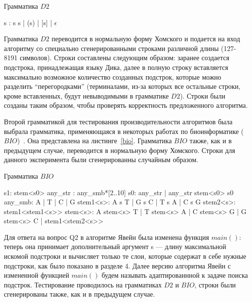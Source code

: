 \begin{listing}
\caption{Грамматика $D2$}

\quad\quad\quad\quad\quad\quad\quad\quad\quad\quad\quad\quad s : s s  |  (s) |  [s]  |  $\epsilon$

\label{dyck}
\end{listing}

Грамматика $D2$ переводится в нормальную форму Хомского и подается на вход алгоритму со специально сгенерированными строками различной длины (127-8191 символов). Строки составлены следующим образом: заранее создается подстрока, принадлежащая языку Дика, далее в полную строку вставляется максимально возможное количество созданных подстрок, которые можно разделить “перегородками” (терминалами, из-за которых все остальные строки, кроме вставленных, будут невыводимыми в грамматике $D2$). Строки были созданы таким образом, чтобы проверять корректность предложенного алгоритма.

Второй грамматикой для тестирования производительности алгоритмов была выбрала грамматика, применяющаяся в некоторых работах по биоинформатике ($BIO$)~\cite{bioinformatics19}. Она представлена на листинге~\ref{bio}. Грамматика $BIO$ также, как и в предыдущем случае, переводится в нормальную форму Хомского. Строки для данного эксперимента были сгенерированны случайным образом.

\begin{listing}[h]
\caption{Грамматика $BIO$}
\begin{pyglist}[]
            s1: stem<s0>
            any_str : any_smb*[2..10]
            s0: any_str | any_str stem<s0> s0
            any_smb: A | T | C | G
            stem1<s>: A s T | G s C | T s A | C s G
            stem2<s>: stem1<stem1<s>>
            stem<s>:
                  A stem<s> T
                | T stem<s> A
                | C stem<s> G
                | G stem<s> C
                | stem1<stem2<s>>
\end{pyglist}
\label{bio}
\end{listing}


Для ответа на вопрос Q2 в алгоритме Явейн была изменена функция $main()$: теперь она принимает дополнительный аргумент s --- длину максимальной искомой подстроки и вычисляет только те слои, которые содержат в себе нужные подстроки, как было показано в разделе 4. Далее версию алгоритма Явейн с измененной функцией $main()$ будем называть адаптированнной к задаче поиска подстрок. Тестирование проводилось на грамматиках $D2$ и $BIO$, строки были сгенерированы также, как и в предыдущем случае.



